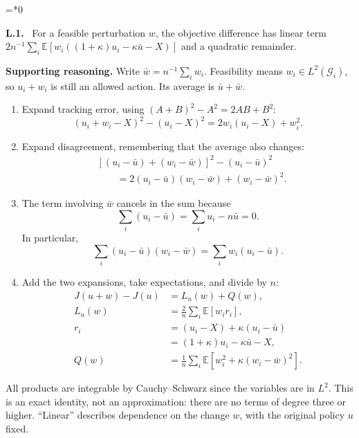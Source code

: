 \documentclass[12pt,letterpaper]{article}
\newcommand{\E}{\mathbb E}
\newcommand{\G}{\mathcal G}
\newenvironment{proofstep}[2]{%
  \begin{list}{}{\leftmargin=\dimexpr 0.17in*#2\relax%
  \setlength{\rightmargin}{0pt}\setlength{\topsep}{5pt}\setlength{\parsep}{2pt}}%
  \item[]\textbf{\textcolor{ink}{#1.}}\ }{\end{list}}
\begin{document}
\begin{proofstep}{L.1}{0}
\label{step:L.1}
For a feasible perturbation $w$, the objective difference has linear term $2n^{-1}\sum_i\E[w_i((1+\kappa)u_i-\kappa\bar u-X)]$ and a quadratic remainder.

\textbf{Supporting reasoning.}
Write $\bar w=n^{-1}\sum_iw_i$. Feasibility means $w_i\in L^2(\G_i)$, so $u_i+w_i$ is still an allowed action. Its average is $\bar u+\bar w$.
\begin{enumerate}
\item Expand tracking error, using $(A+B)^2-A^2=2AB+B^2$:
\[
(u_i+w_i-X)^2-(u_i-X)^2=2w_i(u_i-X)+w_i^2.
\]
\item Expand disagreement, remembering that the average also changes:
\begin{align*}
&[(u_i-\bar u)+(w_i-\bar w)]^2-(u_i-\bar u)^2\\
&\qquad=2(u_i-\bar u)(w_i-\bar w)+(w_i-\bar w)^2.
\end{align*}
\item The term involving $\bar w$ cancels in the sum because
\[
\sum_i(u_i-\bar u)=\sum_i u_i-n\bar u=0.
\]
In particular,
\[
\sum_i(u_i-\bar u)(w_i-\bar w)=\sum_iw_i(u_i-\bar u).
\]
\item Add the two expansions, take expectations, and divide by $n$:
\begin{align*}
J(u+w)-J(u)&=L_u(w)+Q(w),\\
L_u(w)&=\frac2n\sum_i\E[w_i r_i],\\
r_i&=(u_i-X)+\kappa(u_i-\bar u)\\
&=(1+\kappa)u_i-\kappa\bar u-X,\\
Q(w)&=\frac1n\sum_i\E[w_i^2+\kappa(w_i-\bar w)^2].
\end{align*}
\end{enumerate}
All products are integrable by Cauchy--Schwarz since the variables are in $L^2$. This is an exact identity, not an approximation: there are no terms of degree three or higher. ``Linear'' describes dependence on the change $w$, with the original policy $u$ fixed.
\par{}
\end{proofstep}
\end{document}
